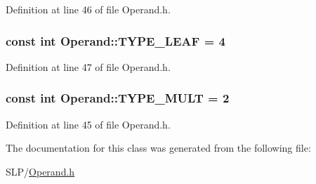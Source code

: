 Definition at line 46 of file Operand.\+h.

\hypertarget{class_operand_a9d9c7e7ff88c2ce280aa1332f9b12913}{
\subsubsection[{T\+Y\+P\+E\+\_\+\+L\+E\+A\+F}]{\setlength{\rightskip}{0pt plus 5cm}const int Operand\+::\+T\+Y\+P\+E\+\_\+\+L\+E\+A\+F = 4\hspace{0.3cm}{\ttfamily [static]}}}\label{class_operand_a9d9c7e7ff88c2ce280aa1332f9b12913}


Definition at line 47 of file Operand.\+h.

\hypertarget{class_operand_a081453264453622326e975742d65bdc8}{
\subsubsection[{T\+Y\+P\+E\+\_\+\+M\+U\+L\+T}]{\setlength{\rightskip}{0pt plus 5cm}const int Operand\+::\+T\+Y\+P\+E\+\_\+\+M\+U\+L\+T = 2\hspace{0.3cm}{\ttfamily [static]}}}\label{class_operand_a081453264453622326e975742d65bdc8}


Definition at line 45 of file Operand.\+h.



The documentation for this class was generated from the following file\+:\begin{DoxyCompactItemize}
\item 
S\+L\+P/\hyperlink{_operand_8h}{Operand.\+h}\end{DoxyCompactItemize}
